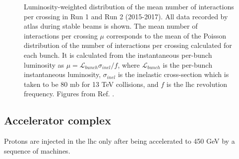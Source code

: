 \begin{figure}[ht]
\centering
{}
\caption{Luminosity-weighted distribution of the mean number of interactions per crossing in 
 Run 1 and  Run 2 (2015-2017). All data recorded by \gls{atlas} during stable beams is shown. The mean number of interactions per crossing $\mu$ corresponds to the mean of the Poisson distribution of the number of interactions per crossing calculated for each bunch. It is calculated from the instantaneous per-bunch luminosity as 
$\mu = \mathcal{L}_{bunch}\sigma_{inel}/f$, where $\mathcal{L}_{bunch}$ is the per-bunch instantaneous luminosity, $\sigma_{inel}$ is the inelastic cross-section which is taken to be 80 mb for 13 TeV collisions, and $f$ is the \gls{lhc} revolution frequency. Figures from Ref. \cite{LumiTwiki}.}
\label{fig:atlas:pu}
\end{figure}


\subsection{Accelerator complex}

Protons are injected in the \gls{lhc} only after being accelerated to 450 GeV by a sequence of machines.

